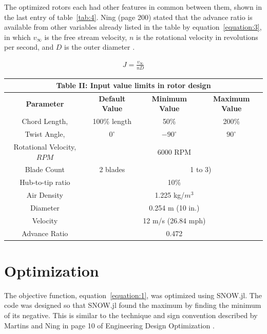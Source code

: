 \documentclass[journal ]{new-aiaa}
\begin{document}
The optimized rotors each had other features in common between them, shown in the last entry of table~\eqref{tab:4}. Ning (page 200) stated that the advance ratio is available from other variables already listed in the table by equation~\eqref{equation:3}, in which $v_{\infty}$ is the free stream velocity, $n$ is the rotational velocity in revolutions per second, and $D$ is the outer diameter \cite{ComAer}.

\begin{equation}
	\begin{aligned}
	\label{equation:3}
	J = \frac{v_{\infty}}{n D}
	\end{aligned}
\end{equation}

\begin{center}
\begin{tabular}{| c | c | c | c |}
	\multicolumn{4}{c}{Table II: Input value limits in rotor design} \\ \hline
  	 \textbf{Parameter} & \textbf{Default Value} & \textbf{Minimum Value} & \textbf{Maximum Value} \\ \hline
	 Chord Length, & 100\% length & 50\% & 200\% \\ \hline
	 Twist Angle, & $0^{\circ}$ & $-90^{\circ}$ & $90^{\circ}$ \\ \hline \hline
	 Rotational Velocity, $RPM$ & \multicolumn{3}{c|}{6000 RPM} \\ \hline
	 Blade Count & 2 blades & \multicolumn{2}{c|}{1 to 3)}\\ \hline
	 Hub-to-tip ratio & \multicolumn{3}{c|}{10\%} \\ \hline
	 Air Density & \multicolumn{3}{c|}{1.225 kg/$m^{3}$} \\ \hline
	 Diameter & \multicolumn{3}{c|}{0.254 m (10 in.)} \\ \hline
	 Velocity & \multicolumn{3}{c|}{12 m/s (26.84 mph)} \\ \hline
	 Advance Ratio & \multicolumn{3}{c|}{0.472} \\ \hline
\end{tabular}
\label{tab:4}
\end{center}

\section{Optimization}

The objective function, equation~\eqref{equation:1}, was optimized using SNOW.jl. The code was designed so that SNOW.jl found the maximum by finding the minimum of its negative. This is similar to the technique and sign convention described by Martins and Ning in page 10 of Engineering Design Optimization \cite{EngDesOpt}.
\end{document}

